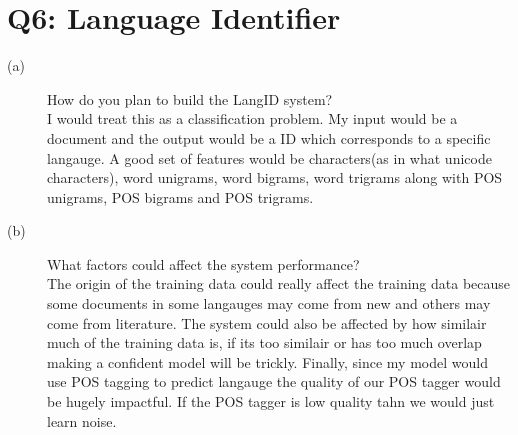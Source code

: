\documentclass[11pt]{article}
\begin{document}
\section{Q6: Language Identifier}
 \begin{description}
  \item [(a)]How do you plan to build the LangID system? \\ I would treat this as a classification problem. My input would be a document and the output would be a ID which corresponds to a specific langauge. A good set of features would be characters(as in what unicode characters), word unigrams, word bigrams, word trigrams along with POS unigrams, POS bigrams and POS trigrams. 
  \item [(b)]What factors could affect the system performance? \\ The origin of the training data could really affect the training data because some documents in some langauges may come from new and others may come from literature. The system could also be affected by how similair much of the training data is, if its too similair or has too much overlap making a confident model will be trickly. Finally, since my model would use POS tagging to predict langauge the quality of our POS tagger would be hugely impactful. If the POS tagger is low quality tahn we would just learn noise.
 \end{description}
\end{document}
